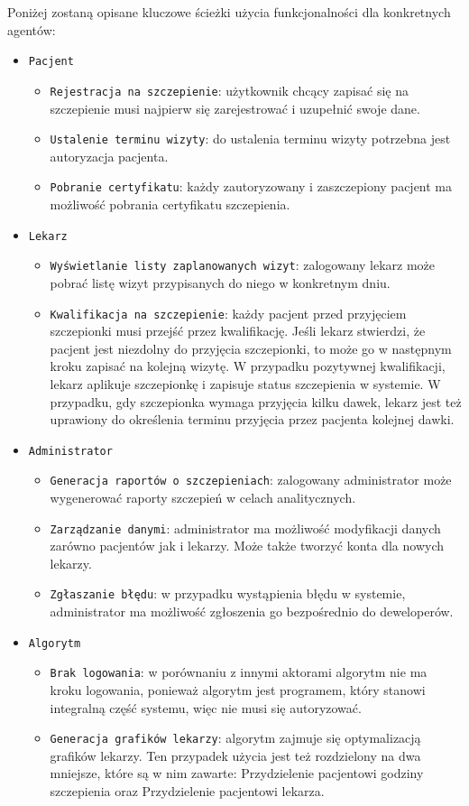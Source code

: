 \documentclass[a4paper,12pt,polish]{article}
\begin{document}
Poniżej zostaną opisane kluczowe ścieżki użycia funkcjonalności dla konkretnych agentów:
\begin{itemize}
    \item \texttt{Pacjent}
    \begin{itemize}
        \item \texttt{Rejestracja na szczepienie}: użytkownik chcący zapisać się na szczepienie musi najpierw się zarejestrować i uzupełnić swoje dane.
        \item \texttt{Ustalenie terminu wizyty}: do ustalenia terminu wizyty potrzebna jest autoryzacja pacjenta.
        \item \texttt{Pobranie certyfikatu}: każdy zautoryzowany i zaszczepiony pacjent ma możliwość pobrania certyfikatu szczepienia.
    \end{itemize}
    \item \texttt{Lekarz} 
    \begin{itemize}
        \item \texttt{Wyświetlanie listy zaplanowanych wizyt}: zalogowany lekarz może pobrać listę wizyt przypisanych do niego w konkretnym dniu.
        \item \texttt{Kwalifikacja na szczepienie}: każdy pacjent przed przyjęciem szczepionki musi przejść przez kwalifikację. Jeśli lekarz stwierdzi, że pacjent jest niezdolny do przyjęcia szczepionki, to może go w następnym kroku zapisać na kolejną wizytę. W przypadku pozytywnej kwalifikacji, lekarz aplikuje szczepionkę i zapisuje status szczepienia w systemie. W przypadku, gdy szczepionka wymaga przyjęcia kilku dawek, lekarz jest też uprawiony do określenia terminu przyjęcia przez pacjenta kolejnej dawki.
    \end{itemize}
    \item \texttt{Administrator} 
    \begin{itemize}
        \item \texttt{Generacja raportów o szczepieniach}: zalogowany administrator może wygenerować raporty szczepień w celach analitycznych.
        \item \texttt{Zarządzanie danymi}: administrator ma możliwość modyfikacji danych zarówno pacjentów jak i lekarzy. Może także tworzyć konta dla nowych lekarzy.
        \item \texttt{Zgłaszanie błędu}: w przypadku wystąpienia błędu w systemie, administrator ma możliwość zgłoszenia go bezpośrednio do deweloperów.
     \end{itemize}
    \item \texttt{Algorytm}
    \begin{itemize}
        \item \texttt{Brak logowania}: w porównaniu z innymi aktorami algorytm nie ma kroku logowania, ponieważ algorytm jest programem, który stanowi integralną część systemu, więc nie musi się autoryzować.
        \item \texttt{Generacja grafików lekarzy}: algorytm zajmuje się optymalizacją grafików lekarzy. Ten przypadek użycia jest też rozdzielony na dwa mniejsze, które są w nim zawarte: Przydzielenie pacjentowi godziny szczepienia oraz Przydzielenie pacjentowi lekarza.
     \end{itemize}
\end{itemize}
\end{document}
